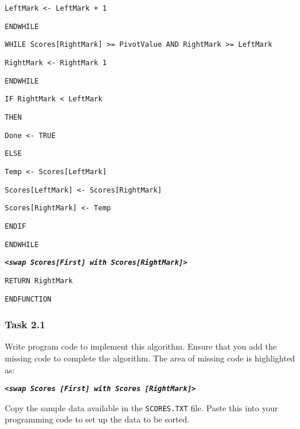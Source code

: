 \begin{minipage}[t]{1\columnwidth}
\noindent \texttt{\qquad{}\qquad{}\qquad{}LeftMark <- LeftMark
+ 1}

\noindent \texttt{\qquad{}\qquad{}ENDWHILE}

\noindent \texttt{\qquad{}\qquad{}WHILE Scores{[}RightMark{]} >=
PivotValue AND RightMark >= LeftMark}

\noindent \texttt{\qquad{}\qquad{}\qquad{}RightMark <- RightMark
\textemdash{} 1}

\noindent \texttt{\qquad{}\qquad{}ENDWHILE}

\noindent \texttt{\qquad{}\qquad{}IF RightMark < LeftMark}

\noindent \texttt{\qquad{}\qquad{}\qquad{}THEN}

\noindent \texttt{\qquad{}\qquad{}\qquad{}\qquad{}Done <- TRUE}

\noindent \texttt{\qquad{}\qquad{}ELSE}

\noindent \texttt{\qquad{}\qquad{}\qquad{}Temp <- Scores{[}LeftMark{]}}

\noindent \texttt{\qquad{}\qquad{}\qquad{}Scores{[}LeftMark{]}
<- Scores{[}RightMark{]}}

\noindent \texttt{\qquad{}\qquad{}\qquad{}Scores{[}RightMark{]}
<- Temp}

\noindent \texttt{\qquad{}ENDIF}

\noindent \texttt{ENDWHILE }\bigskip{}

\noindent \texttt{\textbf{\emph{<swap Scores{[}First{]} with Scores{[}RightMark{]}>}}}\texttt{
}\bigskip{}

\noindent \texttt{\qquad{}RETURN RightMark}

\noindent \texttt{ENDFUNCTION}%
\end{minipage}

\subsubsection*{Task 2.1}

Write program code to implement this algorithm. Ensure that you add
the missing code to complete the algorithm. The area of missing code
is highlighted as:
\begin{center}
\texttt{\textbf{\emph{<swap Scores {[}First{]} with Scores {[}RightMark{]}>}}}
\par\end{center}

Copy the sample data available in the \texttt{SCORES.TXT} file. Paste
this into your programming code to set up the data to be sorted.

